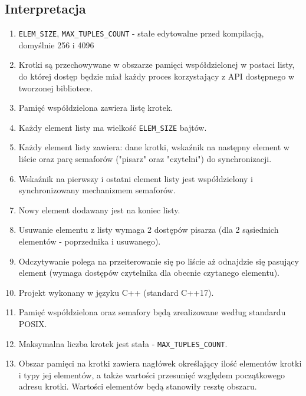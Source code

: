 \documentclass[a4paper]{article}
\begin{document}
	\subsection{Interpretacja}
	\begin{enumerate}
		\item \texttt{ELEM\_SIZE}, \texttt{MAX\_TUPLES\_COUNT} - stałe edytowalne przed kompilacją, domyślnie 256 i 4096
		\item Krotki są przechowywane w obszarze pamięci współdzielonej w postaci listy, do której dostęp będzie miał każdy proces korzystający z API dostępnego w tworzonej bibliotece.
		\item Pamięć współdzielona zawiera listę krotek.
		\item Każdy element listy ma wielkość \texttt{ELEM\_SIZE} bajtów.
		\item Każdy element listy zawiera: dane krotki, wskaźnik na następny element w liście oraz parę semaforów ("pisarz" oraz "czytelni") do synchronizacji.
		\item Wskaźnik na pierwszy i ostatni element listy jest współdzielony i synchronizowany mechanizmem semaforów.
		\item Nowy element dodawany jest na koniec listy.
		\item Usuwanie elementu z listy wymaga 2 dostępów pisarza (dla 2 sąsiednich elementów - poprzednika i usuwanego).
		\item Odczytywanie polega na przeiterowanie się po liście aż odnajdzie się pasujący element (wymaga dostępów czytelnika dla obecnie czytanego elementu).
		\item Projekt wykonany w języku C++ (standard C++17).
		\item Pamięć współdzielona oraz semafory będą zrealizowane według standardu POSIX.
		\item Maksymalna liczba krotek jest stała - \texttt{MAX\_TUPLES\_COUNT}.
		\item Obszar pamięci na krotki zawiera nagłówek określający ilość elementów krotki i typy jej elementów, a także wartości przesunięć względem początkowego adresu krotki. Wartości elementów będą stanowiły resztę obszaru.
	\end{enumerate}
	
\end{document}
